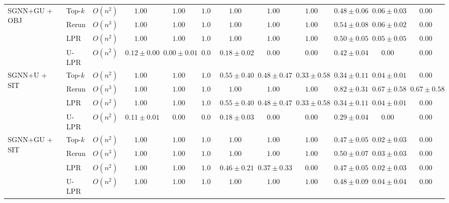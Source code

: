 \documentclass[11pt]{article}
\theoremstyle{plain}
\theoremstyle{remark}
\theoremstyle{plain}
\begin{document}
\begin{table}[t]
{\begin{tabular}{lllccccccccc}
      \midrule
      \multirow{4}{*}{SGNN+GU + OBJ}
      & Top-$k$   & $O(n^2)$ & $1.00$ & $1.00$ & $1.00$
      & $1.00$ & $1.00$ & $1.00$
      & $0.48{\pm}0.06$ & $0.06{\pm}0.03$ & $0.00$ \\
      & Rerun     & $O(n^3)$ & $1.00$ & $1.00$ & $1.00$
      & $1.00$ & $1.00$ & $1.00$
      & $0.54{\pm}0.08$ & $0.06{\pm}0.02$ & $0.00$ \\
      & LPR       & $O(n^2)$ & $1.00$ & $1.00$ & $1.00$
      & $1.00$ & $1.00$ & $1.00$
      & $0.50{\pm}0.05$ & $0.05{\pm}0.05$ & $0.00$ \\
      & U-LPR     & $O(n^2)$ & $0.12{\pm}0.00$ & $0.00{\pm}0.01$ & $0.00$
      & $0.18{\pm}0.02$ & $0.00$ & $0.00$
      & $0.42{\pm}0.04$ & $0.00$ & $0.00$ \\
      \midrule
      \multirow{4}{*}{SGNN+U + SIT}
      & Top-$k$   & $O(n^2)$ & $1.00$ & $1.00$ & $1.00$
      & $0.55{\pm}0.40$ & $0.48{\pm}0.47$ & $0.33{\pm}0.58$
      & $0.34{\pm}0.11$ & $0.04{\pm}0.01$ & $0.00$ \\
      & Rerun     & $O(n^3)$ & $1.00$ & $1.00$ & $1.00$
      & $1.00$ & $1.00$ & $1.00$
      & $\mathbf{0.82{\pm}0.31}$ & $\mathbf{0.67{\pm}0.58}$ & $\mathbf{0.67{\pm}0.58}$ \\
      & LPR       & $O(n^2)$ & $1.00$ & $1.00$ & $1.00$
      & $0.55{\pm}0.40$ & $0.48{\pm}0.47$ & $0.33{\pm}0.58$
      & $0.34{\pm}0.11$ & $0.04{\pm}0.01$ & $0.00$ \\
      & U-LPR     & $O(n^2)$ & $0.11{\pm}0.01$ & $0.00$ & $0.00$
      & $0.18{\pm}0.03$ & $0.00$ & $0.00$
      & $0.29{\pm}0.04$ & $0.00$ & $0.00$ \\
      \midrule
      \multirow{4}{*}{SGNN+GU + SIT}
      & Top-$k$   & $O(n^2)$ & $1.00$ & $1.00$ & $1.00$
      & $1.00$ & $1.00$ & $1.00$
      & $0.47{\pm}0.05$ & $0.02{\pm}0.03$ & $0.00$ \\
      & Rerun     & $O(n^3)$ & $1.00$ & $1.00$ & $1.00$
      & $1.00$ & $1.00$ & $1.00$
      & $0.50{\pm}0.07$ & $0.03{\pm}0.03$ & $0.00$ \\
      & LPR       & $O(n^2)$ & $1.00$ & $1.00$ & $1.00$
      & $0.46{\pm}0.21$ & $0.37{\pm}0.33$ & $0.00$
      & $0.47{\pm}0.05$ & $0.02{\pm}0.03$ & $0.00$ \\
      & U-LPR     & $O(n^2)$ & $\mathbf{1.00}$ & $\mathbf{1.00}$ & $\mathbf{1.00}$
      & $\mathbf{1.00}$ & $\mathbf{1.00}$ & $\mathbf{1.00}$
      & $0.48{\pm}0.09$ & $0.04{\pm}0.04$ & $0.00$ \\
      \bottomrule
    \end{tabular}%
  }
\end{table}
\end{document}

